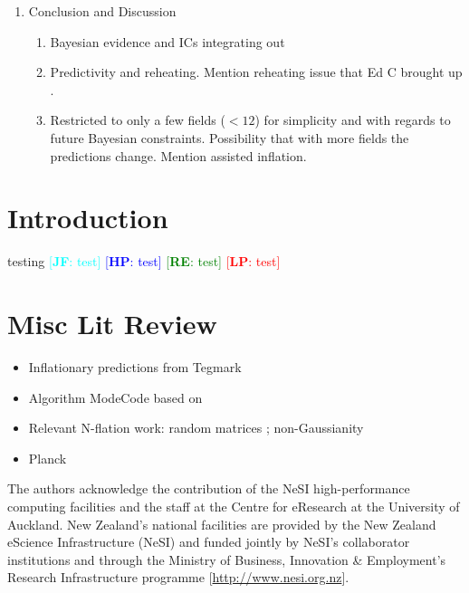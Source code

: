 \documentclass[a4paper,11pt]{article}
\newcommand{\re}[1]{\textcolor{green}{[{\bf RE}: #1]}}
\newcommand{\lp}[1]{\textcolor{red}{[{\bf LP}: #1]}}
\newcommand{\hp}[1]{\textcolor{blue}{[{\bf HP}: #1]}}
\newcommand{\jf}[1]{\textcolor{cyan}{[{\bf JF}: #1]}}
\begin{document}
\begin{enumerate}
  \item Conclusion and Discussion

    \begin{enumerate}

      \item Bayesian evidence and ICs integrating out

      \item Predictivity and reheating.  Mention reheating issue that Ed C brought up \cite{Leung:2012ve}.

      \item Restricted to only a few fields ($<12$) for simplicity and with regards to future Bayesian constraints.  Possibility that with more fields the predictions change.  Mention assisted inflation.

    \end{enumerate}

\end{enumerate}

\section{Introduction}
\label{sect:introduction}

testing \jf{test} \hp{test} \re{test} \lp{test}


\section{Misc Lit Review}
\label{sect:litreview}

\begin{itemize}

  \item Inflationary predictions from Tegmark \cite{Tegmark:2004qd}

  \item Algorithm ModeCode based on \cite{Adams:2001vc}

  \item Relevant N-flation work: random matrices \cite{Easther:2005zr}; non-Gaussianity \cite{Kim:2011jea,Barnaby:2010vf,Kim:2006te}

  \item Planck \cite{Ade:2013xsa,Ade:2013rta}

\end{itemize}




\acknowledgments

The authors acknowledge the contribution of the NeSI high-performance computing facilities and the staff at the Centre for eResearch at the University of Auckland. New Zealand's national facilities are provided by the New Zealand eScience Infrastructure (NeSI) and funded jointly by NeSI's collaborator institutions and through the Ministry of Business, Innovation \& Employment's Research Infrastructure programme [{\url{http://www.nesi.org.nz}}].





\end{document}
